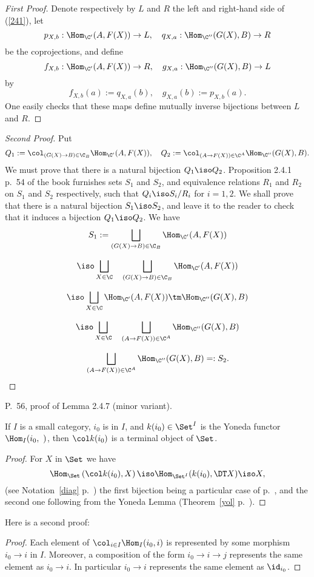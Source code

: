 \documentclass[12pt]{article}
\theoremstyle{remark}
\theoremstyle{definition}
\begin{document}
\begin{proof}[First Proof]
Denote respectively by $L$ and $R$ the left and right-hand side of (\ref{241}), let 
$$
p_{X,b}:\Hom_{\C'}(A,F(X))\to L,\quad q_{X,a}:\Hom_{\C''}(G(X),B)\to R
$$
be the coprojections, and define 
$$
f_{X,b}:\Hom_{\C'}(A,F(X))\to R,\quad g_{X,a}:\Hom_{\C''}(G(X),B)\to L
$$
by
$$
f_{X,b}(a):=q_{X,a}(b),\quad g_{X,a}(b):=p_{X,b}(a).
$$
One easily checks that these maps define mutually inverse bijections between $L$ and $R$. 
\end{proof}

\begin{proof}[Second Proof]
Put 
$$
Q_1:=\col_{(G(X)\to B)\in\C_B}\Hom_{\C'}(A,F(X)),\quad Q_2:=\col_{(A\to F(X))\in\C^A}\Hom_{\C''}(G(X),B).
$$ 
We must prove that there is a natural bijection $Q_1\iso Q_2$. Proposition 2.4.1 p.~54 of the book furnishes sets $S_1$ and $S_2$, and equivalence relations $R_1$ and $R_2$ on $S_1$ and $S_2$ respectively, such that $Q_i\iso S_i/R_i$ for $i=1,2$. We shall prove that there is a natural bijection $S_1\iso S_2$, and leave it to the reader to check that it induces a bijection $Q_1\iso Q_2$. We have 
$$
S_1:=\bigsqcup_{(G(X)\to B)\in\C_B}\Hom_{\C'}(A,F(X))
$$

$$
\iso\bigsqcup_{X\in\C}\quad\bigsqcup_{(G(X)\to B)\in\C_B}\Hom_{\C'}(A,F(X))
$$

$$
\iso\bigsqcup_{X\in\C}\Hom_{\C'}(A,F(X))\tm\Hom_{\C''}(G(X),B)
$$

$$
\iso\bigsqcup_{X\in\C}\quad\bigsqcup_{(A\to F(X))\in\C^A}\Hom_{\C''}(G(X),B)
$$

$$
\bigsqcup_{(A\to F(X))\in\C^A}\Hom_{\C''}(G(X),B)=:S_2.
$$
\end{proof}



\begin{s} 
P.~56, proof of Lemma 2.4.7 (minor variant).

\begin{lem} 
If $I$ is a small category, $i_0$ is in $I$, and $k(i_0)\in\Set^I$ is the Yoneda functor $\Hom_I(i_0,\ )$, then $\col k(i_0)$ is a terminal object of $\Set$. 
\end{lem}

\begin{proof}
For $X$ in $\Set$ we have %
$$
\Hom_{\Set}\left(\col k(i_0),X\right)\iso\Hom_{{\Set}^I}(k(i_0),\DT X)\iso X,
$$
(see Notation~\ref{diag} p.~) the first bijection being a particular case of  p.~, and the second one following from the Yoneda Lemma (Theorem~\ref{yol} p.~).
\end{proof}

Here is a second proof:

\begin{proof}
Each element of $\col_{i\in I}\Hom_I(i_0,i)$ is represented by some morphism $i_0\to i$ in $I$. Moreover, a composition of the form $i_0\to i\to j$ represents the same element as 
$i_0\to i$. In particular $i_0\to i$ represents the same element as $\id_{i_0}$. 
\end{proof}
\end{s}
\end{document}
